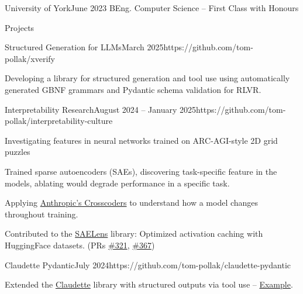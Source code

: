 \documentclass{structure}
\begin{document}
\begin{rSubsectionNoList}{University of York}{June 2023}{
        BEng. Computer Science -- First Class with Honours
    }{}{}
\end{rSubsectionNoList}



\begin{rSection}{Projects}

    \begin{rSubsection}{Structured Generation for LLMs}{March 2025}{}{}{https://github.com/tom-pollak/xverify}{}
        \item Developing a library for structured generation and tool use using automatically generated GBNF grammars and Pydantic schema validation for RLVR.
    \end{rSubsection}

    \begin{rSubsection}{Interpretability Research}{August 2024 -- January 2025}{}{}{https://github.com/tom-pollak/interpretability-culture}{}

        \item Investigating features in neural networks trained on ARC-AGI-style 2D grid puzzles

        \item Trained sparse autoencoders (SAEs), discovering task-specific feature in the models, ablating would degrade performance in a specific task.

        \item Applying \href{https://transformer-circuits.pub/2024/crosscoders/index.html}{Anthropic's Crosscoders} to understand how a model changes throughout training.

        \item Contributed to the \href{https://github.com/jbloomAus/SAELens}{SAELens} library: Optimized activation caching with HuggingFace datasets. (PRs \href{https://github.com/jbloomAus/SAELens/pull/321}{\#321}, \href{https://github.com/jbloomAus/SAELens/pull/367}{\#367})

    \end{rSubsection}

    \begin{rSubsection}{Claudette Pydantic}{July 2024}{}{}{https://github.com/tom-pollak/claudette-pydantic}{}
        \item Extended the \href{https://github.com/AnswerDotAI/claudette}{Claudette} library with structured outputs via tool use -- {\color{blue}\href{https://nbviewer.org/github/tom-pollak/claudette-pydantic/blob/main/nbs/examples/pet_store.ipynb}{Example}}.
    \end{rSubsection}


\end{rSection}
\end{document}
